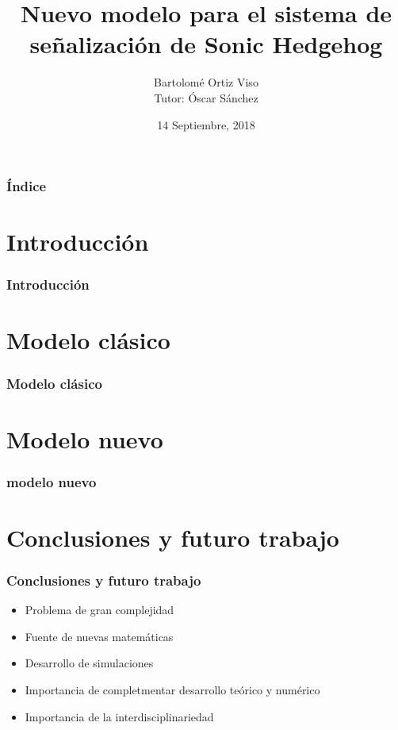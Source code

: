 \documentclass{beamer}
\title[Sonic Hedgehog signaling system]{
  Nuevo modelo para el sistema de señalización de Sonic Hedgehog}
\subtitle{}
\author[Bartolomé Ortiz Viso]{
  Bartolomé Ortiz Viso \\\medskip
  {\small Tutor: Óscar Sánchez} }
\institute[Universidad de Granada]{
  Trabajo Fin de Máster  \\
  Máster en Física y Matemáticas}
\date[14 Septiembre, 2018]{
  14 Septiembre, 2018}
\begin{document}
\begin{frame}
  \titlepage
\end{frame}

\begin{frame}
  \frametitle{Índice}

  \tableofcontents
\end{frame}

\section{Introducción}

\begin{frame}
  \frametitle{Introducción}

\end{frame}

\section{Modelo clásico}

\begin{frame}
  \frametitle{Modelo clásico}

\end{frame}


\section{Modelo nuevo}


\begin{frame}
	\frametitle{modelo nuevo}

\end{frame}


\section{Conclusiones y futuro trabajo}

\begin{frame}
	\frametitle{Conclusiones y futuro trabajo}
	
	\begin{itemize}
		\item Problema de gran complejidad
		\item Fuente de nuevas matemáticas
		\item Desarrollo de simulaciones 
		\item Importancia de completmentar desarrollo teórico y numérico
		\item Importancia de la interdisciplinariedad
	\end{itemize}
\end{frame}
\end{document}
